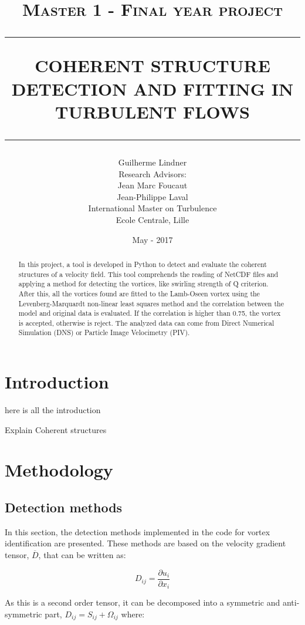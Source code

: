 \documentclass[12pt, a4paper, openany]{memoir}
\title{ \normalsize \textsc{Master 1 - Final year project}
	\\ [2.0cm]
	\hrule
	\vspace{0.5cm}
	\LARGE \textbf{\uppercase{Coherent structure detection and fitting in turbulent flows}} \\ [0.5cm]
	\hrule
	\vspace{0.5cm}
	\normalsize  \vspace*{5\baselineskip}}
\date{\vfill May - 2017}
\author{
	\Large Guilherme Lindner \\ [1.0cm]
	Research Advisors: \\
	Jean Marc Foucaut \\
	Jean-Philippe Laval  \\ [1.0cm]
	International Master on Turbulence\\ [0.2cm]
	Ecole Centrale, Lille \\}
\begin{document}
	
	\maketitle
	\thispagestyle{empty}
	\let\cleardoublepage\clearpage
	\frontmatter
	\begin{abstract}
		In this project, a tool is developed in Python to detect and evaluate the coherent structures of a velocity field.
		This tool comprehends the reading of NetCDF files and applying a method for detecting the vortices, like swirling strength of Q criterion. After this, all the vortices found are fitted to the Lamb-Oseen vortex using the Levenberg-Marquardt non-linear least squares method and the correlation between the model and original data is evaluated. If the correlation is higher than 0.75, the vortex is accepted, otherwise is reject. The analyzed data can come from Direct Numerical Simulation (DNS) or Particle Image Velocimetry (PIV).
	\end{abstract}
	\newpage
	\tableofcontents
	\newpage
	\listoftables
	\newpage
	\listoffigures

    \mainmatter

\chapter*{Introduction}
here is all the introduction

Explain Coherent structures


\chapter{Methodology}

\section{Detection methods}
In this section, the detection methods implemented in the code for vortex identification are presented. These methods are based on the velocity gradient tensor, $\overline{D}$, that can be written as:

\begin{equation}
D_{ij} = \frac{\partial u_i}{\partial x_i}
\end{equation}

As this is a second order tensor, it can be decomposed into a symmetric and anti-symmetric part, $D_{ij} = S_{ij} + \Omega_{ij}$ where:
\end{document}
